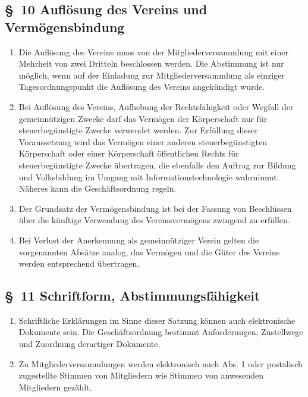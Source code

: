 \documentclass[10pt,a4paper]{scrartcl}
\begin{document}
\subsection*{\S \ 10 Aufl{\"o}sung des Vereins und Verm{\"o}gensbindung}
\begin{enumerate}
	\item Die Aufl{\"o}sung des Vereins muss von der Mitgliederversammlung mit einer Mehrheit von
		zwei Dritteln beschlossen werden. Die Abstimmung ist nur m{\"o}glich, wenn auf der Einladung
		zur Mitgliederversammlung als einziger Tagesordnungspunkt die Aufl{\"o}sung des Vereins
		angek{\"u}ndigt wurde.
	\item Bei Aufl{\"o}sung des Vereins, Aufhebung der Rechtsf{\"a}higkeit oder Wegfall der
		gemeinn{\"u}tzigen Zwecke darf das Verm{\"o}gen der K{\"o}rperschaft nur f{\"u}r
		steuerbeg{\"u}nstigte Zwecke verwendet werden. Zur Erf{\"u}llung dieser
		Voraussetzung wird das Verm{\"o}gen einer anderen steu\-er\-be\-g{\"u}ns\-tig\-ten
		K{\"o}rperschaft oder einer K{\"o}rperschaft {\"o}ffentlichen Rechts f{\"u}r
		steuerbeg{\"u}nstigte Zwecke {\"u}ber\-tra\-gen, die ebenfalls den Auftrag
		zur Bildung und Volksbildung im Umgang mit Informationstechnologie
		wahrnimmt. N{\"a}\-he\-res kann die Gesch{\"a}ftsordnung regeln.
	\item Der Grundsatz der Verm{\"o}gensbindung ist bei der Fassung von
		Beschl{\"u}ssen {\"u}ber die k{\"u}nf\-ti\-ge Verwendung des Vereinsverm{\"o}gens zwingend
		zu erf{\"u}llen.
	\item Bei Verlust der Anerkennung als gemeinn{\"u}tziger Verein gelten die vorgenannten Abs{\"a}tze analog, 
		das Verm{\"o}gen und die G{\"u}ter des Vereins werden entsprechend {\"u}bertragen.
\end{enumerate}
%
%
\subsection*{\S \ 11 Schriftform, Abstimmungsf{\"a}higkeit}
\begin{enumerate}
	\item Schriftliche Erkl{\"a}rungen im Sinne dieser Satzung k{\"o}nnen auch
		elektronische Dokumente sein. Die Gesch{\"a}ftsordnung bestimmt
		Anforderungen, Zustellwege und Zuordnung derartiger Dokumente.
	\item Zu Mitgliederversammlungen werden elektronisch nach Abs. 1 oder
		postalisch zugestellte Stimmen von Mitgliedern wie Stimmen
		von anwesenden Mitgliedern gez{\"a}hlt.
\end{enumerate}
\end{document}
